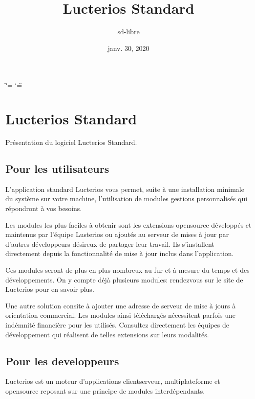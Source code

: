 \documentclass[letterpaper,10pt,french]{sphinxmanual}
\title{Lucterios Standard}
\date{janv. 30, 2020}
\author{sd-libre}
\begin{document}
\ifdefined\shorthandoff
  \ifnum\catcode`\=\string=\active\shorthandoff{=}\fi
  \ifnum\catcode`\"=\active{}\fi
\fi

\pagestyle{empty}
\sphinxmaketitle
\pagestyle{plain}
\sphinxtableofcontents
\pagestyle{normal}
\label{\detokenize{index::doc}}



\chapter{Lucterios Standard}
\label{\detokenize{standard/index:lucterios-standard}}\label{\detokenize{standard/index::doc}}
Présentation du logiciel Lucterios Standard.


\section{Pour les utilisateurs}
\label{\detokenize{standard/index:pour-les-utilisateurs}}
L’application standard Lucterios vous permet, suite à une installation minimale du système sur votre machine, l’utilisation de modules gestions personnalisés qui répondront à vos besoins.

Les modules les plus faciles à obtenir sont les extensions open\sphinxhyphen{}source développés et maintenus par l’équipe Lusterios ou ajoutés au serveur de mises à jour par d’autres développeurs désireux de partager leur travail. Ils s’installent directement depuis la fonctionnalité de mise à jour inclus dans l’application.

Ces modules seront de plus en plus nombreux au fur et à mesure du temps et des développements. On y compte déjà plusieurs modules: rendez\sphinxhyphen{}vous sur le site de Lucterios pour en savoir plus.

Une autre solution consite à ajouter une adresse de serveur de mise à jours à orientation commercial. Les modules ainsi téléchargés nécessitent parfois une indémnité financière pour les utilisés. Consultez directement les équipes de développement qui réalisent de telles extensions sur leurs modalités.


\section{Pour les developpeurs}
\label{\detokenize{standard/index:pour-les-developpeurs}}
Lucterios est un moteur d’applications client\sphinxhyphen{}serveur, multi\sphinxhyphen{}plateforme et open\sphinxhyphen{}source reposant sur une principe de modules interdépendants.
\end{document}
